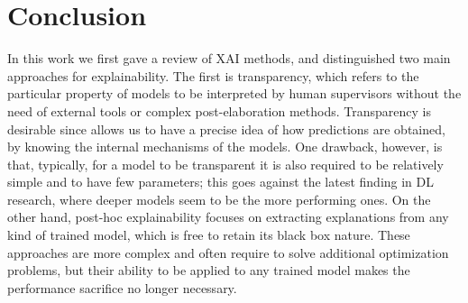 \chapter{Conclusion}
\label{conclusion}
In this work we first gave a review of XAI methods, and distinguished two main approaches for explainability. The first is transparency, which refers to the particular property of models to be interpreted by human supervisors without the need of external tools or complex post-elaboration methods. Transparency is desirable since allows us to have a precise idea of how predictions are obtained, by knowing the internal mechanisms of the models. One drawback, however, is that, typically, for a model to be transparent it is also required to be relatively simple and to have few parameters; this goes against the latest finding in DL research, where deeper models seem to be the more performing ones. On the other hand, post-hoc explainability focuses on extracting explanations from any kind of trained model, which is free to retain its black box nature. These approaches are more complex and often require to solve additional optimization problems, but their ability to be applied to any trained model makes the performance sacrifice no longer necessary.

